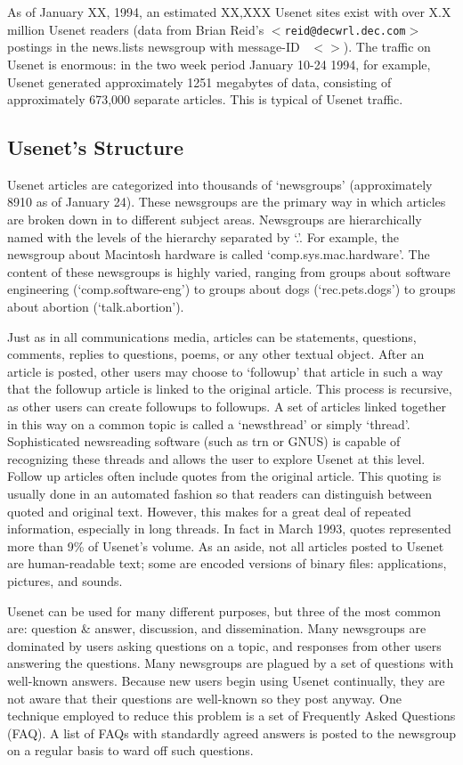 As of January XX, 1994, an estimated XX,XXX Usenet sites exist with over X.X
million Usenet readers (data from Brian Reid's {\tt $<$reid@decwrl.dec.com$>$}
postings in the news.lists newsgroup with message-ID {\tt
$<$$>$}). The traffic on Usenet is enormous: in
the two week period January 10-24 1994, for example, Usenet generated
approximately 1251 megabytes of data, consisting of approximately 673,000
separate articles.  This is typical of Usenet traffic.

\subsection{Usenet's Structure}

Usenet articles are categorized into thousands of `newsgroups' (approximately
8910 as of January 24). These newsgroups are the primary way in which articles
are broken down in to different subject areas. Newsgroups are hierarchically
named with the levels of the hierarchy separated by `.'. For example, the
newsgroup about Macintosh hardware is called `comp.sys.mac.hardware'. The
content of these newsgroups is highly varied, ranging from groups about
software engineering (`comp.software-eng') to groups about dogs
(`rec.pets.dogs') to groups about abortion (`talk.abortion').

Just as in all communications media, articles can be statements, questions,
comments, replies to questions, poems, or any other textual object. After an
article is posted, other users may choose to `followup' that article in such a
way that the followup article is linked to the original article. This process
is recursive, as other users can create followups to followups. A set of
articles linked together in this way on a common topic is called a `newsthread'
or simply `thread'. Sophisticated newsreading software (such as trn or GNUS) is
capable of recognizing these threads and allows the user to explore Usenet at
this level. Follow up articles often include quotes from the original article.
This quoting is usually done in an automated fashion so that readers can
distinguish between quoted and original text. However, this makes for a great
deal of repeated information, especially in long threads. In fact in March
1993, quotes represented more than 9\% of Usenet's volume. As an aside, not all
articles posted to Usenet are human-readable text; some are encoded versions of
binary files: applications, pictures, and sounds.

Usenet can be used for many different purposes, but three of the most common
are: question \& answer, discussion, and dissemination. Many newsgroups are
dominated by users asking questions on a topic, and responses from other users
answering the questions. Many newsgroups are plagued by a set of questions with
well-known answers. Because new users begin using Usenet continually, they are
not aware that their questions are well-known so they post anyway. One
technique employed to reduce this problem is a set of Frequently Asked
Questions (FAQ). A list of FAQs with standardly agreed answers is posted to the
newsgroup on a regular basis to ward off such questions.

